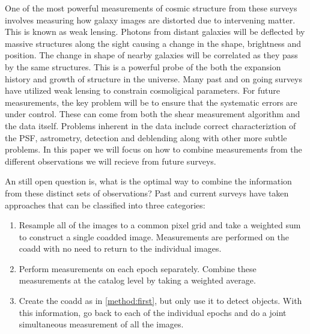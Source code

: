 \documentclass[fleqn,useAMS,usenatbib]{mnras}
\begin{document}
One of the most powerful measurements of cosmic structure from these surveys involves measuring
how galaxy images are distorted due to intervening matter.  This is known as weak lensing.
Photons from distant galaxies will be deflected by massive structures along the sight causing
a change in the shape, brightness and position.  The change in shape of nearby galaxies will 
be correlated as they pass by the same structures.  This is a powerful probe of the both the
expansion history and growth of structure in the universe.  Many past and on going surveys have
utilized weak lensing to constrain cosmoligical parameters.
For future measurements, the key problem will be to ensure that the systematic errors are under control.  
These can come from both the shear measurement algorithm and the data itself.  
Problems inherent in the data include correct characteriztion
of the PSF, astrometry, detection and deblending along with other more subtle problems.  In this paper
we will focus on how to combine measurements from the different observations we will recieve from future surveys.

An still open question is, what is the optimal way to combine the information from these 
distinct sets of observations?  Past and current surveys have taken approaches that can be
classified 
into three categories:
\begin{enumerate}
\item \label{method:first} Resample all of the images to a common pixel grid and 
take a weighted sum to construct a single coadded image.  Measurements are 
performed on the coadd with no need to return to the individual images.
\item \label{method:second} Perform measurements on each epoch separately.  
Combine these measurements at the catalog level by taking a weighted average.  
\item \label{method:third} Create the coadd as in \ref{method:first}, but only 
use it to detect objects.  With this information, go back to each of the 
individual epochs and do a joint simultaneous measurement of all the images.
\end{enumerate}
\end{document}
